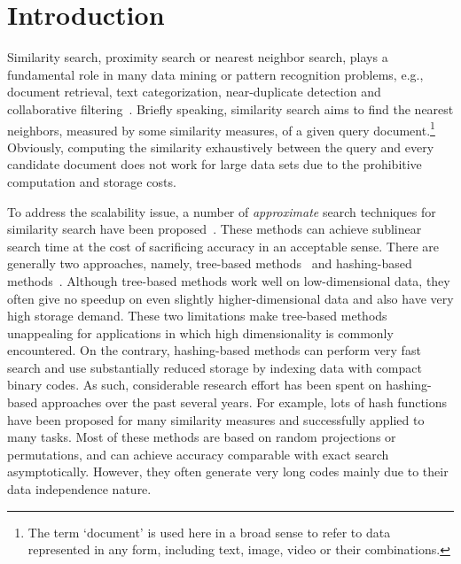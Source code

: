 
\chapter{Introduction}

Similarity search, \aka proximity search or nearest neighbor search, plays a fundamental role in many data mining or pattern recognition problems, e.g., document retrieval, text categorization, near-duplicate detection and collaborative filtering~\cite{yianilos1993soda,shakhnarovich2006book}. Briefly speaking, similarity search aims to find the nearest neighbors, measured by some similarity measures, of a given query document.\footnote{The term `document' is used here in a broad sense to refer to data represented in any form, including text, image, video or their combinations.} Obviously, computing the similarity exhaustively between the query and every candidate document does not work for large data sets due to the prohibitive computation and storage costs.

To address the scalability issue, a number of \textit{approximate} search techniques for similarity search have been proposed~\cite{arya1998jacm,Friedman1977atms,andoni2006focs,shakhnarovich2005thesis}. These methods can achieve sublinear search time at the cost of sacrificing accuracy in an acceptable sense. There are generally two approaches, namely, tree-based methods~\cite{arya1998jacm,Friedman1977atms,weber1998vldb} and hashing-based methods~\cite{andoni2006focs,shakhnarovich2005thesis}. Although tree-based methods work well on low-dimensional data, they often give no speedup on even slightly higher-dimensional data and also have very high storage demand. These two limitations make tree-based methods unappealing for applications in which high dimensionality is commonly encountered. On the contrary, hashing-based methods can perform very fast search and use substantially reduced storage by indexing data with compact binary codes. As such, considerable research effort has been spent on hashing-based approaches over the past several years. For example, lots of hash functions have been proposed for many similarity measures and successfully applied to many tasks. Most of these methods are based on random projections or permutations, and can achieve accuracy comparable with exact search asymptotically. However, they often generate very long codes mainly due to their data independence nature. %

